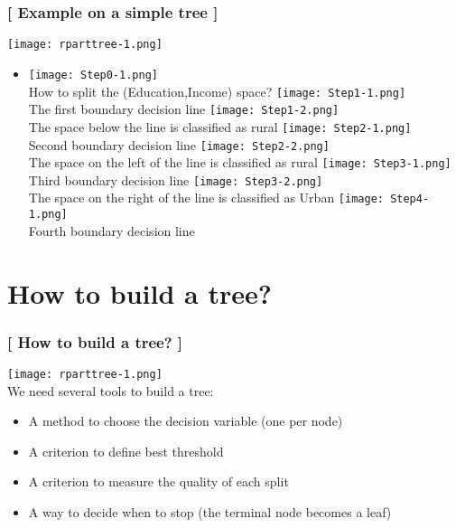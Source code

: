 \documentclass[xcolor=x11names,compress, handhouts]{beamer}
\renewcommand{\(}{\begin{columns}}
\renewcommand{\)}{\end{columns}}
\newcommand{\<}[1]{\begin{column}{#1}}
\renewcommand{\>}{\end{column}}
\begin{document}
\begin{frame} %
\frametitle{\textcolor{brique}{[ Example on a simple tree ]}}
\hfill \texttt{[image: rparttree-1.png]}
\begin{itemize}
\item[]
    {\texttt{[image: Step0-1.png]} \\ }
    {How to split the (Education,Income) space?}
    {\texttt{[image: Step1-1.png]} \\ }
    {The first boundary decision line}
    { \texttt{[image: Step1-2.png]} \\ }
    {The space below the line is classified as  rural}
    {\texttt{[image: Step2-1.png]} \\ }
    {Second boundary decision line}
    {\texttt{[image: Step2-2.png]} \\ }
    {The space on the left of the line is classified as  rural}
    {\texttt{[image: Step3-1.png]} \\ }
    {Third boundary decision line}
    {\texttt{[image: Step3-2.png]} \\ }
    {The space on the right of the line is classified as  Urban}
    {\texttt{[image: Step4-1.png]} \\ }
    {Fourth boundary decision line}
\end{itemize}
\end{frame}

\section{How to build a tree?}

\begin{frame}
\frametitle{\textcolor{brique}{[ How to build a tree? ]}}
 \hfill \texttt{[image: rparttree-1.png]} \\

We need several tools to build a tree:
\pause
\begin{itemize}[<+->]
    \item  A method to choose the decision variable (one per node)
    \item  A criterion to define best threshold
    \item  A criterion to measure the quality of each split
    \item  A way to decide when to stop (the terminal node becomes a leaf)
\end{itemize}
\end{frame}
\end{document}
